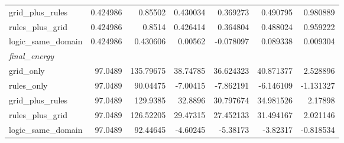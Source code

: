 \begin{tabular}{lrrrrrr}
  grid_plus_rules & 0.424986 & 0.85502 & 0.430034 & 0.369273 & 0.490795 & 0.980889 \\
  rules_plus_grid & 0.424986 & 0.8514 & 0.426414 & 0.364804 & 0.488024 & 0.959222 \\
  logic_same_domain & 0.424986 & 0.430606 & 0.00562 & -0.078097 & 0.089338 & 0.009304 \\
  \multicolumn{7}{l}{\textit{final_energy}} \\
  grid_only & 97.0489 & 135.79675 & 38.74785 & 36.624323 & 40.871377 & 2.528896 \\
  rules_only & 97.0489 & 90.04475 & -7.00415 & -7.862191 & -6.146109 & -1.131327 \\
  grid_plus_rules & 97.0489 & 129.9385 & 32.8896 & 30.797674 & 34.981526 & 2.17898 \\
  rules_plus_grid & 97.0489 & 126.52205 & 29.47315 & 27.452133 & 31.494167 & 2.021146 \\
  logic_same_domain & 97.0489 & 92.44645 & -4.60245 & -5.38173 & -3.82317 & -0.818534 \\
\bottomrule
\end{tabular}
